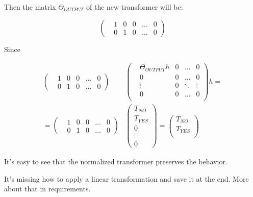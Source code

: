 Then the matrix $\Theta_{OUTPUT}$ of the new transformer will be:

\begin{equation*}
    \left(\begin{matrix}
        &1 &0 &0 &\dots &0 \\
        &0 &1 &0 &\dots &0 
    \end{matrix}\right)
\end{equation*}

Since

\begin{align*}
    \left(\begin{matrix}
        &1 &0 &0 &\dots &0 \\
        &0 &1 &0 &\dots &0 
    \end{matrix}\right)
    &\left(\begin{matrix}
        &\Theta_{OUTPUT}h &0 &\dots  &0 \\
        &0                &0 &\dots  &0 \\
        &\vdots           &0 &\ddots &\vdots \\
        &0                &0 &\dots  &0 \\
    \end{matrix}\right)h = \\
    = \left(\begin{matrix}
        &1 &0 &0 &\dots &0 \\
        &0 &1 &0 &\dots &0 
    \end{matrix}\right)
    &\left(\begin{matrix}
        T_{NO} \\
        T_{YES} \\ 
        0 \\
        \vdots \\
        0
    \end{matrix}\right) = 
    \left(\begin{matrix}
        T_{NO} \\
        T_{YES} \\ 
    \end{matrix}\right)
\end{align*}

It's easy to see that the normalized transformer preserves the behavior.

It's missing how to apply a linear transformation and save it at the end. More about that in requirements.

